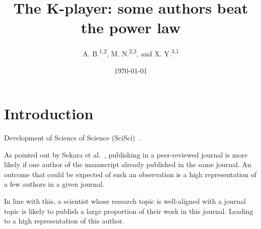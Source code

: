 \documentclass[aps,prl,floatfix,twocolumn]{revtex4-1}
\begin{document}
\title{The K-player: some authors beat the power law}

\author{A. B.\textsuperscript{1,2}, M. N.\textsuperscript{2,3}, and X. Y.\textsuperscript{3,1}}

\date{\today}

\begin{abstract}
 \textcolor{red}{\lipsum[1]}
\end{abstract}

\maketitle

\section{Introduction} 


Development of Science of Science (SciSci)~\cite{For18}. 

As pointed out by Sekara et al.~\cite{Sek18}, publishing in a peer-reviewed journal is more likely if one author of the manuscript already published in the same journal.
An outcome that could be expected of such an observation is a high representation of a few authors in a given journal. 

In line with this, a scientist whose research topic is well-aligned with a journal topic is likely to publish a large proportion of their work in this journal.
Leading to a high representation of this author. 
\end{document}
